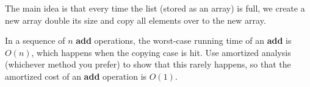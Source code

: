 The main idea is that every time the list (stored as an array) is full, we create a new array double its size and copy all elements over to the new array.

In a sequence of $n$ \textbf{add} operations, the worst-case running time of an \textbf{add} is $O(n)$, which happens when the copying case is hit. Use amortized analysis (whichever method you prefer) to show that this rarely happens, so that the amortized cost of an \textbf{add} operation is $O(1)$.
